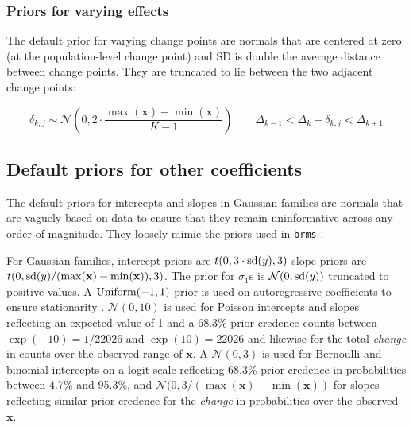 \documentclass[
  american,
]{article}
\begin{document}
\hypertarget{priors-for-varying-effects}{%
\subsubsection{Priors for varying effects}\label{priors-for-varying-effects}}

The default prior for varying change points are normals that are centered at zero (at the population-level change point) and SD is double the average distance between change points. They are truncated to lie between the two adjacent change points:

\begin{equation}
\delta_{k, j} \sim \mathcal{N}(0, 2 \cdot \frac{\max(\mathbf{x}) - \min(\mathbf{x})}{K - 1}) \hspace{2em} \Delta_{k-1} < \Delta_k + \delta_{k, j} < \Delta_{k + 1}
\end{equation}

\hypertarget{default-priors-for-other-coefficients}{%
\subsection{Default priors for other coefficients}\label{default-priors-for-other-coefficients}}

The default priors for intercepts and slopes in Gaussian families are normals that are vaguely based on data to ensure that they remain uninformative across any order of magnitude. They loosely mimic the priors used in \texttt{brms} \citep{burkner2017}.

For Gaussian families, intercept priors are \(t(0, 3 \cdot {\rm sd}(y), 3)\) slope priors are \(t(0, {\rm sd}(y) / (\max(\mathbf{x}) - \min(\mathbf{x})), 3)\). The prior for \(\sigma_1\)s is \(\mathcal{N}(0, {\rm sd}(y))\) truncated to positive values. A \({\rm Uniform}(-1, 1)\) prior is used on autoregressive coefficients to ensure stationarity \citep{fuller1981}. \(\mathcal{N}(0, 10)\) is used for Poisson intercepts and slopes reflecting an expected value of 1 and a 68.3\% prior credence counts between \(\exp(-10) = 1 / 22026\) and \(\exp(10) = 22026\) and likewise for the total \emph{change} in counts over the observed range of \(\mathbf{x}\). A \(\mathcal{N}(0, 3)\) is used for Bernoulli and binomial intercepts on a logit scale reflecting 68.3\% prior credence in probabilities between 4.7\% and 95.3\%, and \(\mathcal{N}(0, 3 / (\max(\mathbf{x}) - \min(\mathbf{x}))\) for slopes reflecting similar prior credence for the \emph{change} in probabilities over the observed \(\mathbf{x}\).
\end{document}
